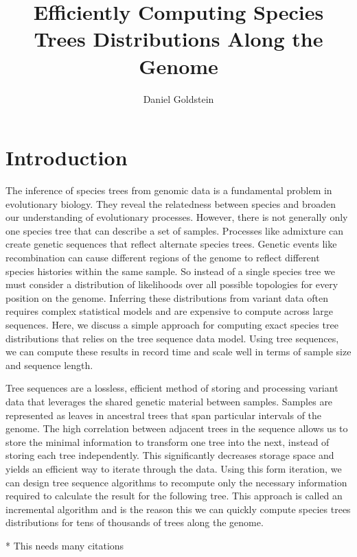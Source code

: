 \documentclass{article}
\begin{document}
\title{Efficiently Computing Species Trees Distributions Along the Genome}
\author{Daniel Goldstein}
\maketitle


\section{Introduction}

The inference of species trees from genomic data is a fundamental problem in
evolutionary biology. They reveal the relatedness between species and broaden 
our understanding of evolutionary processes. However, there is not generally
only one species tree that can describe a set of samples.
Processes like admixture can create genetic sequences that reflect
alternate species trees.
Genetic events like recombination can cause different regions of the genome
to reflect different species histories within the same sample.
So instead of a single species tree we must consider a distribution
of likelihoods over all possible topologies for every position on the genome.
Inferring these distributions from variant data often requires complex
statistical models and are expensive to compute across large sequences.
Here, we discuss a simple approach for computing exact
species tree distributions that relies on the tree sequence data model.
Using tree sequences, we can compute these results in record time and
scale well in terms of sample size and sequence length.

Tree sequences are a lossless, efficient method of storing and processing
variant data that leverages the shared genetic material between samples.
Samples are represented as leaves in ancestral trees that span
particular intervals of the genome. The high correlation between adjacent
trees in the sequence allows us to store the minimal information to transform
one tree into the next, instead of storing each tree independently. This
significantly decreases storage space and yields an efficient way to iterate
through the data. Using this form iteration, we can design tree sequence
algorithms to recompute only the necessary information required to calculate
the result for the following tree.
This approach is called an incremental algorithm and is the reason this
we can quickly compute species trees distributions for tens of thousands of
trees along the genome.

* This needs many citations
\end{document}
